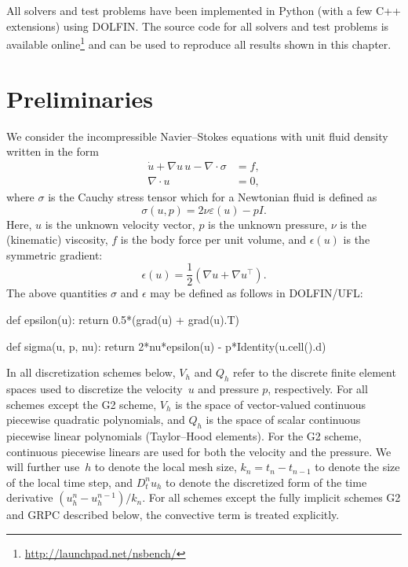 All solvers and test problems have been implemented in Python (with a
few C++ extensions) using DOLFIN. The source code for all solvers and
test problems is available
online\footnote{\url{http://launchpad.net/nsbench/}} and can be used
to reproduce all results shown in this chapter.

\section{Preliminaries}

We consider the incompressible Navier--Stokes equations with unit
fluid density written in the form
\begin{align}
  \label{eq:ns,mom}
  \dot{u} + \nabla u \, u - \nabla \cdot \sigma  &= f, \\
  \label{eq:ns,con}
  \nabla \cdot u &= 0,
\end{align}
where $\sigma$ is the Cauchy stress tensor which for a Newtonian fluid
is defined as
\begin{equation}
  \sigma(u,p) = 2\nu\varepsilon(u) - pI.
\end{equation}
Here, $u$ is the unknown velocity vector, $p$ is the unknown pressure,
$\nu$ is the (kinematic) viscosity, $f$ is the body force per unit
volume, and $\epsilon(u)$ is the symmetric gradient:
\begin{equation}
  \epsilon(u) = \frac{1}{2} (\nabla u + \nabla u^{\top}).
\end{equation}
The above quantities $\sigma$ and $\epsilon$ may be defined as follows
in DOLFIN/UFL:
\begin{python}
def epsilon(u):
    return 0.5*(grad(u) + grad(u).T)
\end{python}
\begin{python}
def sigma(u, p, nu):
    return 2*nu*epsilon(u) - p*Identity(u.cell().d)
\end{python}

In all discretization schemes below, $V_h$ and $Q_h$ refer to the
discrete finite element spaces used to discretize the velocity~$u$ and
pressure $p$, respectively. For all schemes except the G2 scheme,
$V_h$ is the space of vector-valued continuous piecewise quadratic
polynomials, and $Q_h$ is the space of scalar continuous piecewise
linear polynomials (Taylor--Hood elements). For the G2 scheme,
continuous piecewise linears are used for both the velocity and the
pressure. We will further use~$h$ to denote the local mesh size, $k_n
= t_n - t_{n-1}$ to denote the size of the local time step, and $D^n_t
u_h$ to denote the discretized form of the time derivative $(u_h^n -
u_h^{n-1})/k_n$. For all schemes except the fully implicit schemes G2
and GRPC described below, the convective term is treated explicitly.

